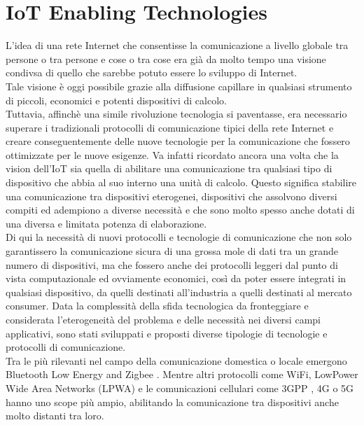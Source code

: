 \section{IoT Enabling Technologies}
\label{sec:iot_enabling_technologies}

L'idea di una rete Internet che consentisse la comunicazione a livello globale tra persone o tra persone e cose o tra cose era già da molto tempo una visione condivsa di quello che sarebbe potuto essere lo sviluppo di Internet. \\
Tale visione è oggi possibile grazie alla diffusione capillare in qualsiasi strumento di piccoli, economici e potenti dispositivi di calcolo. \\
Tuttavia, affinchè una simile rivoluzione tecnologia si paventasse, era necessario superare i tradizionali protocolli di comunicazione tipici della rete Internet e creare conseguentemente delle nuove tecnologie per la comunicazione che fossero ottimizzate per le nuove esigenze.
Va infatti ricordato ancora una volta che la vision dell'IoT sia quella di abilitare una comunicazione tra qualsiasi tipo di dispositivo che abbia al suo interno una unità di calcolo. Questo significa stabilire una comunicazione tra dispositivi eterogenei, dispositivi che assolvono diversi compiti ed adempiono a diverse necessità e che sono molto spesso anche dotati di una diversa e limitata potenza di elaborazione. \\
Di qui la necessità di nuovi protocolli e tecnologie di comunicazione che non solo garantissero la comunicazione sicura di una grossa mole di dati tra un grande numero di dispositivi, ma che fossero anche dei protocolli leggeri dal punto di vista computazionale ed ovviamente economici, così da poter essere integrati in qualsiasi dispositivo, da quelli destinati all'industria a quelli destinati al mercato consumer.
Data la complessità della sfida tecnologica da fronteggiare e considerata l'eterogeneità del problema e delle necessità nei diversi campi applicativi,
sono stati sviluppati e proposti diverse tipologie di tecnologie e protocolli di comunicazione. \\
Tra le più rilevanti nel campo della comunicazione domestica o locale emergono Bluetooth Low Energy \cite{famous:paper_1} and Zigbee \cite{famous:paper_2}. Mentre altri protocolli come WiFi, LowPower Wide Area Networks (LPWA) \cite{famous:paper_3} e le comunicazioni cellulari come 3GPP , 4G o 5G \cite{famous:paper_Grieco_1} hanno uno scope più ampio, abilitando la comunicazione tra dispositivi anche molto distanti tra loro.


